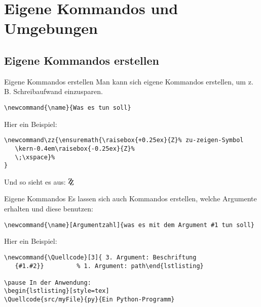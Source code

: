 \section{Eigene Kommandos und Umgebungen}

\subsection{Eigene Kommandos erstellen}

\begin{frame}[fragile]{Eigene Kommandos erstellen}
Man kann sich eigene Kommandos erstellen, um z.\,B. Schreibaufwand einzusparen.

\begin{lstlisting}[style=tex]
\newcommand{\name}{Was es tun soll}\end{lstlisting}

\pause Hier ein Beispiel:
\begin{lstlisting}[style=tex]
\newcommand\zz{\ensuremath{\raisebox{+0.25ex}{Z}% zu-zeigen-Symbol
   \kern-0.4em\raisebox{-0.25ex}{Z}%
   \;\xspace}%
}\end{lstlisting}

\vspace{1ex}\pause Und so sieht es aus: $\zz$
\end{frame}

\begin{frame}[fragile]{Eigene Kommandos}
Es lassen sich auch Kommandos erstellen, welche Argumente erhalten und diese benutzen:

\begin{lstlisting}[style=tex]
\newcommand{\name}[Argumentzahl]{was es mit dem Argument #1 tun soll}\end{lstlisting}

\pause Hier ein Beispiel:

\begin{lstlisting}[style=tex]
\newcommand{\Quellcode}[3]{ 3. Argument: Beschriftung
   {#1.#2}}         % 1. Argument: path\end{lstlisting}

\pause In der Anwendung:
\begin{lstlisting}[style=tex]
\Quellcode{src/myFile}{py}{Ein Python-Programm}\end{lstlisting}
\end{frame}

